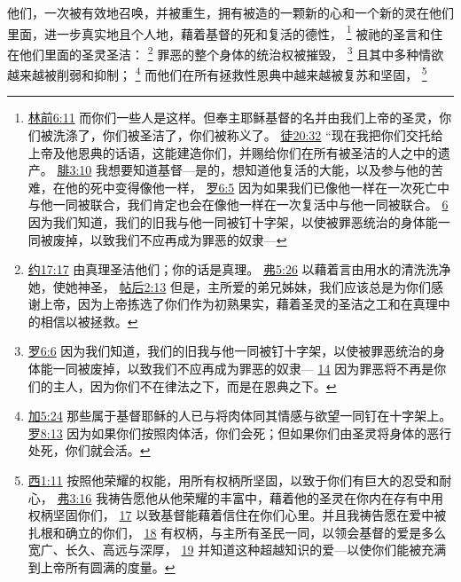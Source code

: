 \documentclass[12pt, a4paper, oneside]{ctexart}
\newcounter{parnum}[section]
\newcommand{\N}{%
   \noindent\refstepcounter{parnum}%
    \makebox[\parindent][l]{\textbf{\arabic{parnum}.}}}
\begin{document}
\N 他们，一次被有效地召唤，并被重生，拥有被造的一颗新的心和一个新的灵在他们里面，进一步真实地且个人地，藉着基督的死和复活的德性，
	\footnote {
		\href{https://biblehub.com/1_corinthians/6-11.htm}{林前6:11} 而你们一些人是这样。但奉主耶稣基督的名并由我们上帝的圣灵，你们被洗涤了，你们被圣洁了，你们被称义了。
		\href{https://biblehub.com/acts/20-32.htm}{徒20:32} “现在我把你们交托给上帝及他恩典的话语，这能建造你们，并赐给你们在所有被圣洁的人之中的遗产。
		\href{https://biblehub.com/philippians/3-10.htm}{腓3:10} 我想要知道基督---是的，想知道他复活的大能，以及参与他的苦难，在他的死中变得像他一样，
		\href{https://biblehub.com/romans/6-5.htm}{罗6:5} 因为如果我们已像他一样在一次死亡中与他一同被联合，我们肯定也会在像他一样在一次复活中与他一同被联合。
		\href{https://biblehub.com/romans/6-6.htm}{6} 因为我们知道，我们的旧我与他一同被钉十字架，以使被罪恶统治的身体能一同被废掉，以致我们不应再成为罪恶的奴隶---
	}
	被祂的圣言和住在他们里面的圣灵圣洁：
	\footnote {
		\href{https://biblehub.com/john/17-17.htm}{约17:17} 由真理圣洁他们；你的话是真理。
		\href{https://biblehub.com/ephesians/5-26.htm}{弗5:26} 以藉着言由用水的清洗洗净她，使她神圣，
		\href{https://biblehub.com/2_thessalonians/2-13.htm}{帖后2:13} 但是，主所爱的弟兄姊妹，我们应该总是为你们感谢上帝，因为上帝拣选了你们作为初熟果实，藉着圣灵的圣洁之工和在真理中的相信以被拯救。
	}
	罪恶的整个身体的统治权被摧毁，
	\footnote {
		\href{https://biblehub.com/romans/6-6.htm}{罗6:6} 因为我们知道，我们的旧我与他一同被钉十字架，以使被罪恶统治的身体能一同被废掉，以致我们不应再成为罪恶的奴隶---
		\href{https://biblehub.com/romans/6-14.htm}{14} 因为罪恶将不再是你们的主人，因为你们不在律法之下，而是在恩典之下。
	}
	且其中多种情欲越来越被削弱和抑制；
	\footnote {
		\href{https://biblehub.com/galatians/5-24.htm}{加5:24} 那些属于基督耶稣的人已与将肉体同其情感与欲望一同钉在十字架上。
		\href{https://biblehub.com/romans/8-13.htm}{罗8:13} 因为如果你们按照肉体活，你们会死；但如果你们由圣灵将身体的恶行处死，你们就会活。
	}
	而他们在所有拯救性恩典中越来越被复苏和坚固，
	\footnote {
		\href{https://biblehub.com/colossians/1-11.htm}{西1:11} 按照他荣耀的权能，用所有权柄所坚固，以致于你们有巨大的忍受和耐心，
		\href{https://biblehub.com/ephesians/3-16.htm}{弗3:16} 我祷告愿他从他荣耀的丰富中，藉着他的圣灵在你内在存有中用权柄坚固你们，
		\href{https://biblehub.com/ephesians/3-17.htm}{17} 以致基督能藉着信住在你们心里。并且我祷告愿在爱中被扎根和确立的你们，
		\href{https://biblehub.com/ephesians/3-18.htm}{18} 有权柄，与主所有圣民一同，以领会基督的爱是多么宽广、长久、高远与深厚，
		\href{https://biblehub.com/ephesians/3-19.htm}{19} 并知道这种超越知识的爱---以使你们能被充满到上帝所有圆满的度量。
	}
\end{document}
